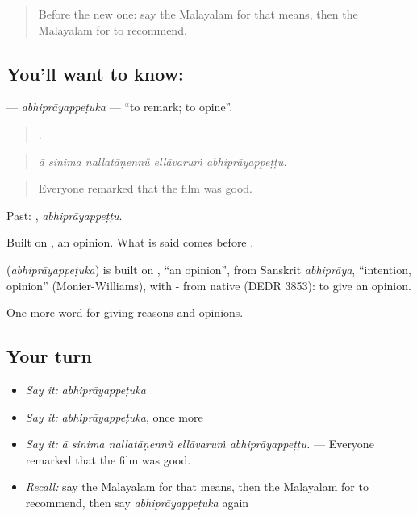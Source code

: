 \begin{quote}
Before the new one: say the Malayalam for that means, then the Malayalam for to recommend.
\end{quote}

\subsection*{You'll want to know: }
\textbf{} — \emph{abhiprāyappeṭuka} — \textquotedblleft{}to remark; to opine\textquotedblright{}.

\begin{quote}
    .
\end{quote}

\begin{quote}
\emph{ā sinima nallatāṇennŭ ellāvaruṁ abhiprāyappeṭṭu.}
\end{quote}

\begin{quote}
Everyone remarked that the film was good.
\end{quote}

Past: , \emph{abhiprāyappeṭṭu}.

Built on , an opinion. What is said comes before .

\begin{cousinweb}
\textbf{} (\emph{abhiprāyappeṭuka}) is built on , \textquotedblleft{}an opinion\textquotedblright{}, from Sanskrit \emph{abhiprāya}, \textquotedblleft{}intention, opinion\textquotedblright{} (Monier-Williams), with - from native  (DEDR 3853): to give an opinion.
\end{cousinweb}

\begin{grammarlens}[title={What you've built}]
One more word for giving reasons and opinions.
\end{grammarlens}

\subsection*{Your turn}
\begin{itemize}
\raggedright
  \item \emph{Say it:} \emph{abhiprāyappeṭuka}
  \item \emph{Say it:} \emph{abhiprāyappeṭuka}, once more
  \item \emph{Say it:} \emph{ā sinima nallatāṇennŭ ellāvaruṁ abhiprāyappeṭṭu.} — Everyone remarked that the film was good.
  \item \emph{Recall:} say the Malayalam for that means, then the Malayalam for to recommend, then say \emph{abhiprāyappeṭuka} again
\end{itemize}

